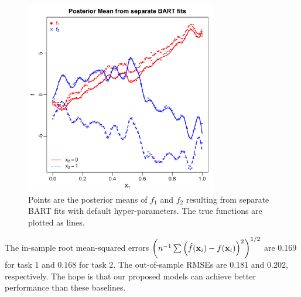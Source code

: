 \documentclass[12pt]{article}
\begin{document}
\begin{figure}[H]
\centering
\includegraphics[width = 0.75\textwidth]{../images/toy_example_sepBART_fits.png}
\caption{Points are the posterior means of $f_{1}$ and $f_{2}$ resulting from separate BART fits with default hyper-parameters. The true functions are plotted as lines.}
\label{fig:toy_example_sepBART_fits}
\end{figure}

The in-sample root mean-squared errors $\left(n^{-1}\sum{\left(\hat{f}(\mathbf{x}_{i}) - f(\mathbf{x}_{i})\right)^{2}}\right)^{1/2}$ are 0.169 for task 1 and 0.168 for task 2.
The out-of-sample RMSEs are 0.181 and 0.202, respectively.
The hope is that our proposed models can achieve better performance than these baselines.






\newpage
\end{document}
